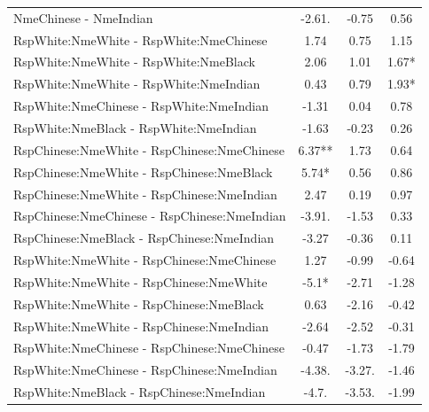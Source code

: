 \documentclass[]{report}
\begin{document}
\begin{table}
\begin{tabular}[t]{lccc}
		NmeChinese - NmeIndian & -2.61. & -0.75 & 0.56 \\ 
		RspWhite:NmeWhite - RspWhite:NmeChinese & 1.74 & 0.75 & 1.15 \\ 
		RspWhite:NmeWhite - RspWhite:NmeBlack & 2.06 & 1.01 & 1.67* \\ 
		RspWhite:NmeWhite - RspWhite:NmeIndian & 0.43 & 0.79 & 1.93* \\ 
		RspWhite:NmeChinese - RspWhite:NmeIndian & -1.31 & 0.04 & 0.78 \\ 
		RspWhite:NmeBlack - RspWhite:NmeIndian & -1.63 & -0.23 & 0.26 \\ 
		RspChinese:NmeWhite - RspChinese:NmeChinese & 6.37** & 1.73 & 0.64 \\ 
		RspChinese:NmeWhite - RspChinese:NmeBlack & 5.74* & 0.56 & 0.86 \\ 
		RspChinese:NmeWhite - RspChinese:NmeIndian & 2.47 & 0.19 & 0.97 \\ 
		RspChinese:NmeChinese - RspChinese:NmeIndian & -3.91. & -1.53 & 0.33 \\ 
		RspChinese:NmeBlack - RspChinese:NmeIndian & -3.27 & -0.36 & 0.11 \\ 
		RspWhite:NmeWhite - RspChinese:NmeChinese & 1.27 & -0.99 & -0.64 \\ 
		RspWhite:NmeWhite - RspChinese:NmeWhite & -5.1* & -2.71 & -1.28 \\ 
		RspWhite:NmeWhite - RspChinese:NmeBlack & 0.63 & -2.16 & -0.42 \\ 
		RspWhite:NmeWhite - RspChinese:NmeIndian & -2.64 & -2.52 & -0.31 \\ 
		RspWhite:NmeChinese - RspChinese:NmeChinese & -0.47 & -1.73 & -1.79 \\ 
		RspWhite:NmeChinese - RspChinese:NmeIndian & -4.38. & -3.27. & -1.46 \\ 
		RspWhite:NmeBlack - RspChinese:NmeIndian & -4.7. & -3.53. & -1.99 \\ 
		\hline
	\end{tabular}
\end{table}



\end{document}
